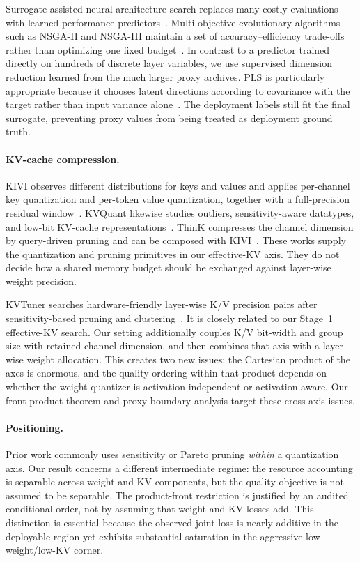 Surrogate-assisted neural architecture search replaces many costly evaluations
with learned performance predictors~\citep{baker2017nas,white2021predictors}.
Multi-objective evolutionary algorithms such as NSGA-II and NSGA-III maintain a
set of accuracy--efficiency trade-offs rather than optimizing one fixed
budget~\citep{deb2002nsga2,deb2014nsga3}.  In contrast to a predictor trained
directly on hundreds of discrete layer variables, we use supervised dimension
reduction learned from the much larger proxy archives.  PLS is particularly
appropriate because it chooses latent directions according to covariance with
the target rather than input variance alone~\citep{wold2001pls}.  The deployment
labels still fit the final surrogate, preventing proxy values from being treated
as deployment ground truth.

\paragraph{KV-cache compression.}
KIVI observes different distributions for keys and values and applies
per-channel key quantization and per-token value quantization, together with a
full-precision residual window~\citep{liu2024kivi}.  KVQuant likewise studies
outliers, sensitivity-aware datatypes, and low-bit KV-cache
representations~\citep{hooper2024kvquant}.  ThinK compresses the channel dimension
by query-driven pruning and can be composed with KIVI~\citep{xu2025think}.  These
works supply the quantization and pruning primitives in our effective-KV axis.
They do not decide how a shared memory budget should be exchanged against
layer-wise weight precision.

KVTuner searches hardware-friendly layer-wise K/V precision pairs after
sensitivity-based pruning and clustering~\citep{li2025kvtuner}.  It is closely
related to our Stage~1 effective-KV search.  Our setting additionally couples
K/V bit-width and group size with retained channel dimension, and then combines
that axis with a layer-wise weight allocation.  This creates two new issues: the
Cartesian product of the axes is enormous, and the quality ordering within that
product depends on whether the weight quantizer is activation-independent or
activation-aware.  Our front-product theorem and proxy-boundary analysis target
these cross-axis issues.

\paragraph{Positioning.}
Prior work commonly uses sensitivity or Pareto pruning \emph{within} a
quantization axis.  Our result concerns a different intermediate regime: the
resource accounting is separable across weight and KV components, but the
quality objective is not assumed to be separable.  The product-front restriction
is justified by an audited conditional order, not by assuming that weight and KV
losses add.  This distinction is essential because the observed joint loss is
nearly additive in the deployable region yet exhibits substantial saturation in
the aggressive low-weight/low-KV corner.
